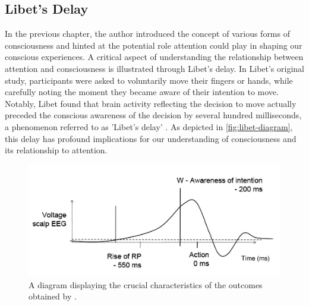 \documentclass[10pt]{article}
\begin{document}
\begin{sloppypar}
  \subsection{Libet’s Delay}
  \label{sec:libet}

  In the previous chapter, the author introduced the concept of various forms of consciousness and hinted at the potential role attention could play in shaping our conscious experiences. A critical aspect of understanding the relationship between attention and consciousness is illustrated through Libet’s delay. In Libet’s original study, participants were asked to voluntarily move their fingers or hands, while carefully noting the moment they became aware of their intention to move. Notably, Libet found that brain activity reflecting the decision to move actually preceded the conscious awareness of the decision by several hundred milliseconds, a phenomenon referred to as 'Libet's delay' \citep{libet_time_1983}. As depicted in \autoref{fig:libet-diagram}, this delay has profound implications for our understanding of consciousness and its relationship to attention.

  \begin{figure}[ht]
    \centering
    \includegraphics[width=\textwidth]{figures/libet.png}
    \caption[A diagram displaying the crucial characteristics of the outcomes obtained by Libet et al.]{A diagram displaying the crucial characteristics of the outcomes obtained by \cite{libet_time_1983} \citep{schurger_accumulator_2012}.}
    \label{fig:libet-diagram}
  \end{figure}

  \newpage


\end{sloppypar}
\end{document}

